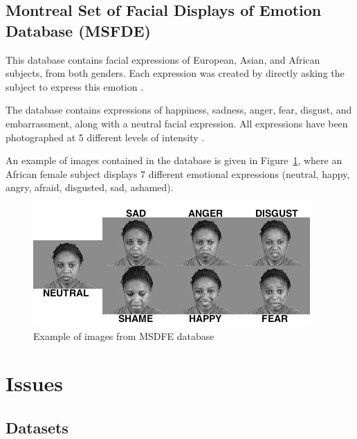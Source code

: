\subsection{Montreal Set of Facial Displays of Emotion Database (MSFDE)}

\vspace{\baselineskip}
\noindent This database contains facial expressions of European, Asian, and African subjects, from both genders. Each expression was created by directly asking the subject to express this emotion \cite{MSFDE}.
\newline

\noindent The database contains expressions of happiness, sadness, anger, fear, disgust, and embarrassment, along with a neutral facial expression. All expressions have been photographed at 5 different levels of intensity \cite{MSFDE}.
\newline

\noindent An example of images contained in the database is given in Figure~\ref{msfde_7facialexpressions}, where an African female subject displays 7 different emotional expressions (neutral, happy, angry, afraid, disgusted, sad, ashamed).
\newline

\begin{figure}[!h]
\begin{center}
\noindent \includegraphics[scale=0.8]{figures/msfde_7facialexpressions} 
\newline
\caption{Example of images from MSDFE database}
\label{msfde_7facialexpressions}
\end{center} 
\end{figure}

\section{Issues}

\vspace{\baselineskip}
\subsection{Datasets}

